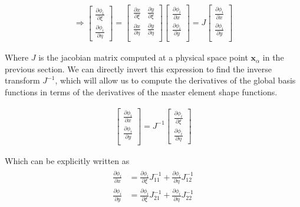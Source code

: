 \documentclass[10pt]{article}
\begin{document}
\begingroup
\renewcommand*{\arraystretch}{1.5}
\begin{align}
  \Rightarrow
  \begin{bmatrix}
    \frac{\partial \phi_i}{\partial \xi} \\
    \frac{\partial \phi_i}{\partial \eta}
  \end{bmatrix}
  =
  \begin{bmatrix}
    \frac{\partial x}{\partial \xi} & \frac{\partial y}{\partial \xi} \\
    \frac{\partial x}{\partial \eta} & \frac{\partial y}{\partial \eta} \\
  \end{bmatrix}
  \begin{bmatrix}
    \frac{\partial \phi_i}{\partial x} \\
    \frac{\partial \phi_i}{\partial y} \\
  \end{bmatrix}
  =J
  \begin{bmatrix}
    \frac{\partial \phi_i}{\partial x} \\
    \frac{\partial \phi_i}{\partial y} \\
  \end{bmatrix}
\end{align}
\endgroup

Where $J$ is the jacobian matrix computed at a physical space point $\bm{x}_\alpha$ in the previous
section. We can directly invert this expression to find the inverse transform $J^{-1}$, which will
allow us to compute the derivatives of the global basis functions in terms of the derivatives of the
master element shape functions.

\begingroup
\renewcommand*{\arraystretch}{1.5}
\begin{align}
  \begin{bmatrix}
    \frac{\partial \phi_i}{\partial x} \\
    \frac{\partial \phi_i}{\partial y} \\
  \end{bmatrix}
  =J^{-1}
  \begin{bmatrix}
    \frac{\partial \phi_i}{\partial \xi} \\
    \frac{\partial \phi_i}{\partial \eta}
  \end{bmatrix}
\end{align}
\endgroup

Which can be explicitly written as 
\begin{align}
    \begin{split}
    \frac{\partial \phi_i}{\partial x}
    &= \frac{\partial \phi_i}{\partial \xi} J^{-1}_{11}
    + \frac{\partial \phi_i}{\partial \eta} J^{-1}_{12} \\
    \frac{\partial \phi_i}{\partial y}
    &= \frac{\partial \phi_i}{\partial \xi} J^{-1}_{21}
    + \frac{\partial \phi_i}{\partial \eta} J^{-1}_{22}
    \end{split}
    \label{eq:def_inv_der}
\end{align}
\end{document}
